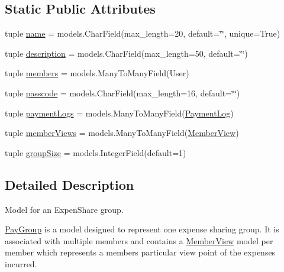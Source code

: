 \subsection*{Static Public Attributes}
\begin{DoxyCompactItemize}
\item 
tuple \hyperlink{classmodels_1_1_pay_group_a497a5404b56ea78ec8ac675985519c25}{name} = models.\-Char\-Field(max\-\_\-length=20, default=\char`\"{}\char`\"{}, unique=True)
\item 
tuple \hyperlink{classmodels_1_1_pay_group_ae8d4cfe4930ebc6b511f82691026a7d7}{description} = models.\-Char\-Field(max\-\_\-length=50, default=\char`\"{}\char`\"{})
\item 
tuple \hyperlink{classmodels_1_1_pay_group_a22c5aadb801b4f26a4c5f675c628cd64}{members} = models.\-Many\-To\-Many\-Field(User)
\item 
tuple \hyperlink{classmodels_1_1_pay_group_a757bf14853860015be63c29d9f4a4b76}{passcode} = models.\-Char\-Field(max\-\_\-length=16, default=\char`\"{}\char`\"{})
\item 
tuple \hyperlink{classmodels_1_1_pay_group_acbb50cbe600d3e3f492a99b948bf38a8}{payment\-Logs} = models.\-Many\-To\-Many\-Field(\hyperlink{classmodels_1_1_payment_log}{Payment\-Log})
\item 
tuple \hyperlink{classmodels_1_1_pay_group_ae13451dcaaa8c881df92549d1e2a3417}{member\-Views} = models.\-Many\-To\-Many\-Field(\hyperlink{classmodels_1_1_member_view}{Member\-View})
\item 
tuple \hyperlink{classmodels_1_1_pay_group_a2ffd41ff089917ffe7350eeae498c356}{group\-Size} = models.\-Integer\-Field(default=1)
\end{DoxyCompactItemize}


\subsection{Detailed Description}
Model for an Expen\-Share group. 

\hyperlink{classmodels_1_1_pay_group}{Pay\-Group} is a model designed to represent one expense sharing group. It is associated with multiple members and contains a \hyperlink{classmodels_1_1_member_view}{Member\-View} model per member which represents a members particular view point of the expenses incurred. 

